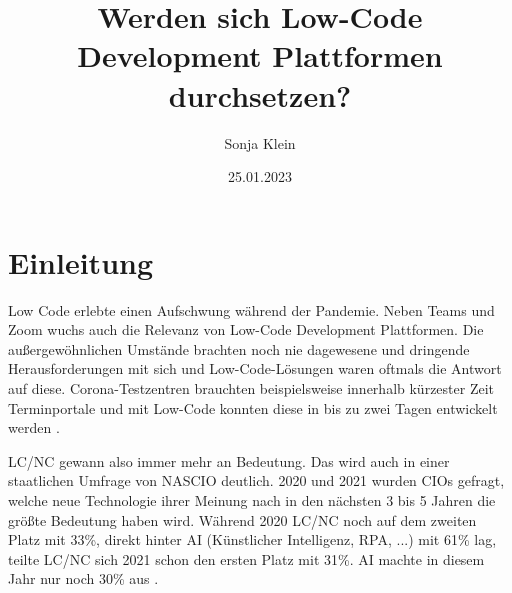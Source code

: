 \documentclass[12pt]{article} %
\title{Werden sich Low-Code Development Plattformen durchsetzen?}
\author{Sonja Klein}
\date{25.01.2023}
\begin{document}
	
	

	
	\maketitle	
	\tableofcontents
	\newpage
	
	\section{Einleitung}
	Low Code erlebte einen Aufschwung während der Pandemie. Neben Teams und Zoom wuchs auch die Relevanz von Low-Code Development Plattformen. Die außergewöhnlichen Umstände brachten noch nie dagewesene und dringende Herausforderungen mit sich und Low-Code-Lösungen waren oftmals die Antwort auf diese. Corona-Testzentren brauchten beispielsweise innerhalb kürzester Zeit Terminportale und mit Low-Code konnten diese in bis zu zwei Tagen entwickelt werden \autocite{AmyGlasscock.2021}. \newline 
	
	LC/NC gewann also immer mehr an Bedeutung. Das wird auch in einer staatlichen Umfrage von NASCIO deutlich. 2020 und 2021 wurden CIOs gefragt, welche neue Technologie ihrer Meinung nach in den nächsten 3 bis 5 Jahren die größte Bedeutung haben wird. Während 2020 LC/NC noch auf dem zweiten Platz mit 33\%, direkt hinter AI (Künstlicher Intelligenz, RPA, ...) mit 61\% lag, teilte LC/NC sich 2021 schon den ersten Platz mit 31\%. AI machte in diesem Jahr nur noch 30\% aus \autocite{AmyGlasscock.2021}.
	
\end{document}
